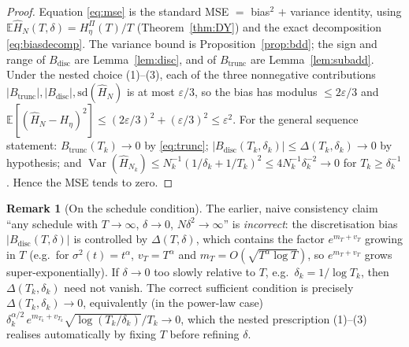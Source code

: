 \documentclass{amsart}
\theoremstyle{definition}
\newtheorem{remark}{Remark}
\DeclareMathOperator{\Var}{Var}
\newcommand{\E}{\mathbb{E}}
\begin{document}
\begin{proof}
Equation \eqref{eq:mse} is the standard MSE $=$ bias$^2$ $+$ variance identity,
using $\E\widehat H_N(T,\delta)=H_\eta^\Pi(T)/T$ (Theorem~\ref{thm:DY}) and the
exact decomposition \eqref{eq:biasdecomp}. The variance bound is
Proposition~\ref{prop:bdd}; the sign and range of $B_{\mathrm{disc}}$ are
Lemma~\ref{lem:disc}, and of $B_{\mathrm{trunc}}$ are Lemma~\ref{lem:subadd}.
Under the nested choice (1)--(3), each of the three nonnegative contributions
$|B_{\mathrm{trunc}}|,|B_{\mathrm{disc}}|,\mathrm{sd}(\widehat H_N)$ is at most
$\varepsilon/3$, so the bias has modulus $\le2\varepsilon/3$ and
$\E[(\widehat H_N-H_\eta)^2]\le(2\varepsilon/3)^2+(\varepsilon/3)^2\le\varepsilon^2$.
For the general sequence statement: $B_{\mathrm{trunc}}(T_k)\to0$ by
\eqref{eq:trunc}; $|B_{\mathrm{disc}}(T_k,\delta_k)|\le\Delta(T_k,\delta_k)\to0$ by
hypothesis; and $\Var(\widehat H_{N_k})\le N_k^{-1}(1/\delta_k+1/T_k)^2
\le 4N_k^{-1}\delta_k^{-2}\to0$ for $T_k\ge\delta_k^{-1}$. Hence the MSE tends to
zero.
\end{proof}

\begin{remark}[On the schedule condition]\label{rem:schedule}
The earlier, naive consistency claim ``any schedule with $T\to\infty$,
$\delta\to0$, $N\delta^2\to\infty$'' is \emph{incorrect}: the discretisation bias
$|B_{\mathrm{disc}}(T,\delta)|$ is controlled by $\Delta(T,\delta)$, which contains
the factor $e^{m_T+v_T}$ growing in $T$ (e.g.\ for $\sigma^2(t)=t^\alpha$,
$v_T=T^\alpha$ and $m_T=O(\sqrt{T^\alpha\log T})$, so $e^{m_T+v_T}$ grows
super-exponentially). If $\delta\to0$ too slowly relative to $T$, e.g.\
$\delta_k=1/\log T_k$, then $\Delta(T_k,\delta_k)$ need not vanish. The correct
sufficient condition is precisely $\Delta(T_k,\delta_k)\to0$, equivalently (in the
power-law case)
$\delta_k^{\alpha/2}\,e^{m_{T_k}+v_{T_k}}\sqrt{\log(T_k/\delta_k)}/T_k\to0$, which the
nested prescription (1)--(3) realises automatically by fixing $T$ before refining
$\delta$.
\end{remark}
\end{document}

